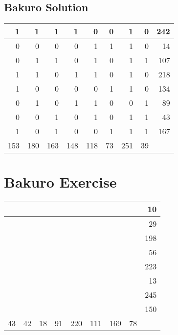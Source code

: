 \documentclass[]{article}
\begin{document}
 \subsection{Bakuro Solution} 
\begin{tabular}{rrrrrrrrr}
\hline
   1 &   1 &   1 &   1 &   0 &  0 &   1 &  0 & 242 \\ \hline
   0 &   0 &   0 &   0 &   1 &  1 &   1 &  0 &  14 \\ \hline
   0 &   1 &   1 &   0 &   1 &  0 &   1 &  1 & 107 \\ \hline
   1 &   1 &   0 &   1 &   1 &  0 &   1 &  0 & 218 \\ \hline
   1 &   0 &   0 &   0 &   0 &  1 &   1 &  0 & 134 \\ \hline
   0 &   1 &   0 &   1 &   1 &  0 &   0 &  1 &  89 \\ \hline
   0 &   0 &   1 &   0 &   1 &  0 &   1 &  1 &  43 \\ \hline
   1 &   0 &   1 &   0 &   0 &  1 &   1 &  1 & 167 \\ \hline
 153 & 180 & 163 & 148 & 118 & 73 & 251 & 39 &     \\ \hline
\hline
\end{tabular}\newpage\section{Bakuro Exercise}\begin{tabular}{rrrrrrrrr}
\hline
    &    &    &    &     &     &     &    &  10 \\ \hline
    &    &    &    &     &     &     &    &  29 \\ \hline
    &    &    &    &     &     &     &    & 198 \\ \hline
    &    &    &    &     &     &     &    &  56 \\ \hline
    &    &    &    &     &     &     &    & 223 \\ \hline
    &    &    &    &     &     &     &    &  13 \\ \hline
    &    &    &    &     &     &     &    & 245 \\ \hline
    &    &    &    &     &     &     &    & 150 \\ \hline
 43 & 42 & 18 & 91 & 220 & 111 & 169 & 78 &     \\ \hline
\hline
\end{tabular}\newpage 
\end{document}
